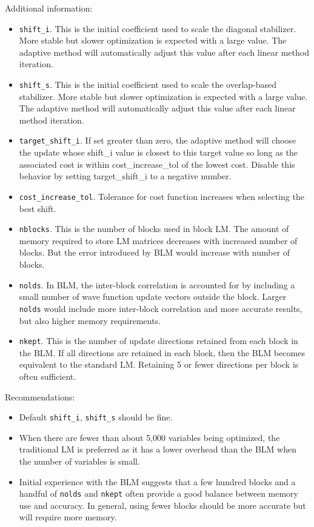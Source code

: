 Additional information:
\begin{itemize}
  \item \texttt{shift\_i}.  This is the initial coefficient used to scale the diagonal stabilizer.
                            More stable but slower optimization is expected with a large value.
                            The adaptive method will automatically adjust this value after each linear method iteration.
  \item \texttt{shift\_s}.  This is the initial coefficient used to scale the overlap-based stabilizer.
                            More stable but slower optimization is expected with a large value.
                            The adaptive method will automatically adjust this value after each linear method iteration.
  \item \texttt{target\_shift\_i}.  If set greater than zero, the adaptive method will choose the update whose shift\_i value is closest to
                              this target value so long as the associated cost is within cost\_increase\_tol of the lowest cost.
                              Disable this behavior by setting target\_shift\_i to a negative number.
  \item \texttt{cost\_increase\_tol}.  Tolerance for cost function increases when selecting the best shift.
  \item \texttt{nblocks}.   This is the number of blocks used in block LM. The amount of memory required to store LM matrices decreases
                            with increased number of blocks. But the error introduced by BLM would increase with number of blocks.  
  \item \texttt{nolds}.     In BLM, the inter-block correlation is accounted for by including a small number of wave function update vectors
                            outside the block. Larger \texttt{nolds} would include more inter-block correlation and more accurate results, but 
                            also higher memory requirements. 
  \item \texttt{nkept}.     This is the number of update directions retained from each block in the BLM. If all directions are retained in each block, 
                            then the BLM becomes equivalent to the standard LM.  Retaining 5 or fewer directions per block is often sufficient.
\end{itemize}

Recommendations:
\begin{itemize}
  \item Default \texttt{shift\_i}, \texttt{shift\_s} should be fine. 
  \item When there are fewer than about 5,000 variables being optimized, the traditional LM is preferred as it has a lower overhead than the BLM when the number of variables is small.
  \item Initial experience with the BLM suggests that a few hundred blocks and a handful of \texttt{nolds} and \texttt{nkept}
        often provide a good balance between memory use and accuracy.  In general, using fewer blocks should be more accurate but will require more memory.
\end{itemize}

